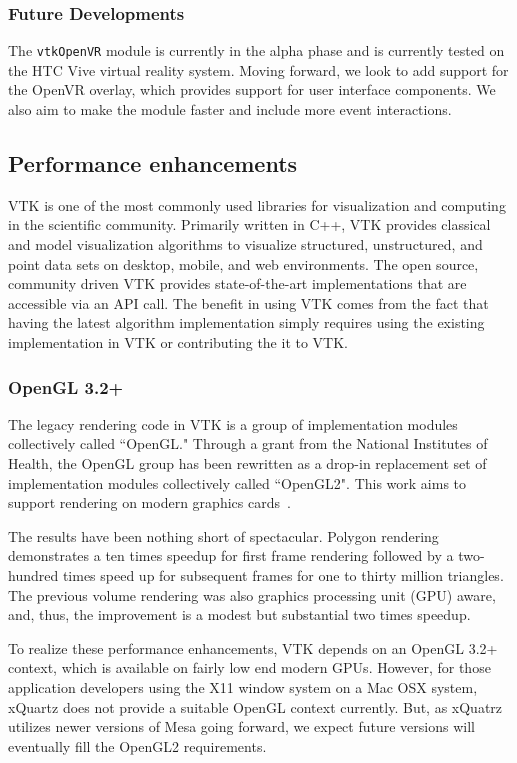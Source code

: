 \subsubsection{Future Developments}

The \texttt{vtkOpenVR}  module is currently in the alpha phase and is currently tested on the HTC Vive virtual reality system.
Moving forward, we look to add support for the OpenVR overlay, which provides support for user interface components.
We also aim to make the module faster and include more event interactions. 

\subsection{Performance enhancements}

VTK is one of the most commonly used libraries for visualization and computing in the scientific community.
Primarily written in C++, VTK provides classical and model visualization algorithms to visualize structured, unstructured, and point data sets on desktop, mobile, and web environments.
The open source, community driven VTK provides state-of-the-art implementations that are accessible via an API call.
The benefit in using VTK comes from the fact that having the latest algorithm implementation simply requires using the existing implementation in VTK or contributing the it to VTK.

\subsubsection{OpenGL 3.2+}

The legacy rendering code in VTK is a group of implementation modules collectively called ``OpenGL."
Through a grant from the National Institutes of Health, the OpenGL group has
been rewritten as a drop-in replacement set of implementation modules
collectively called ``OpenGL2".
This work aims to support rendering on modern graphics cards~\cite{Hanwell:2015}.

The results have been nothing short of spectacular.
Polygon rendering demonstrates a ten times speedup for first frame rendering followed by a two-hundred times speed up for subsequent frames for one to thirty million triangles.
The previous volume rendering was also graphics processing unit (GPU) aware, and, thus, the improvement is a modest but substantial two times speedup. 

To realize these performance enhancements, VTK depends on an OpenGL 3.2+ context, which is available on fairly low end modern GPUs.
However, for those application developers using the X11 window system on a Mac OSX system, xQuartz does not provide a suitable OpenGL context currently.
But, as xQuatrz utilizes newer versions of Mesa going forward, we expect future versions will eventually fill the OpenGL2 requirements.

